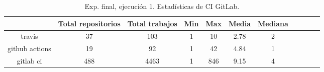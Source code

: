 \begin{table}
  \centering
  \caption{Exp. final, ejecución 1. Estadísticas de CI GitLab.}
  \label{tab:tabla_f1_7}

\begin{footnotesize}
\renewcommand{\arraystretch}{1.5} %
\begin{tabular}{ccccccccccc}
  \hline
  {} &  Total repositorios &  Total trabajos &  Min &  Max &  Media &  Mediana \\
  \hline
  travis         &         37 &         103 &    1 &   10 &   2.78 &        2 \\
  github actions &         19 &          92 &    1 &   42 &   4.84 &        1 \\
  gitlab ci      &        488 &        4463 &    1 &  846 &   9.15 &        4 \\
 \end{tabular}
\end{footnotesize}

\end{table}

